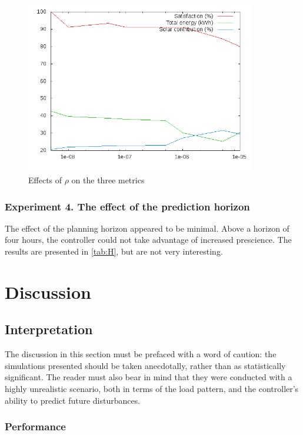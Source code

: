 \begin{figure}
   \centering
   \includegraphics[width=10cm]{images/rho-graphs}
   \caption{Effects of $\rho$ on the three metrics}
   \label{fig:rho-graphs}
\end{figure}

\subsubsection{Experiment 4. The effect of the prediction horizon}

The effect of the planning horizon appeared to be minimal.
Above a horizon of four hours, the controller could not take advantage of increased prescience.
The results are presented in \autoref{tab:H}, but are not very interesting.

\section{Discussion}

\subsection{Interpretation}

The discussion in this section must be prefaced with a word of caution: the simulations presented should be taken anecdotally, rather than as statistically significant.
The reader must also bear in mind that they were conducted with a highly unrealistic scenario, both in terms of the load pattern, and the controller's ability to predict future disturbances.

\subsubsection{Performance}


